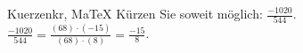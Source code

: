 \begin{MAufgabe}{Kuerzen}{kr, MaTeX}
K\"urzen Sie soweit m\"oglich: $\frac{-1020}{544}$.\\ 
\ifLsg\MLoesung
\quad $\frac{-1020}{544}=\frac{(68)\cdot(-15)}{(68)\cdot(8)}=\frac{-15}{8}$.\else\relax\fi
 \end{MAufgabe}